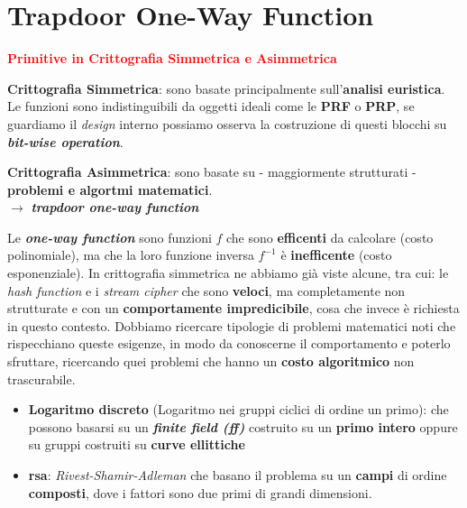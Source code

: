 \newpage

\section{Trapdoor One-Way Function}

\begin{flushleft}
    \textcolor{red}{\textbf{Primitive in Crittografia Simmetrica e Asimmetrica}}
    \begin{center}
        \begin{minipage}[t]{0.45\textwidth}
            \textbf{Crittografia Simmetrica}: sono basate principalmente sull'\textbf{analisi euristica}. Le funzioni sono indistinguibili da oggetti ideali come le \textbf{PRF} o \textbf{PRP}, se guardiamo il \textit{design} interno possiamo osserva la costruzione di questi blocchi su \textbf{\textit{bit-wise operation}}.
        \end{minipage}
        \hfill
        \begin{minipage}[t]{0.45\textwidth}
            \textbf{Crittografia Asimmetrica}: sono basate su - maggiormente strutturati - \textbf{problemi e algortmi matematici}. \\
            $\rightarrow$ \textbf{\textit{trapdoor one-way function}}
        \end{minipage}
    \end{center}

    Le \textbf{\textit{one-way function}} sono funzioni $f$ che sono \textbf{efficenti} da calcolare (costo polinomiale), ma che la loro funzione inversa $f^{-1}$ è \textbf{inefficente} (costo esponenziale). In crittografia simmetrica ne abbiamo già viste alcune, tra cui: le \textit{hash function} e i \textit{stream cipher} che sono \textbf{veloci}, ma completamente non strutturate e con un \textbf{comportamente impredicibile}, cosa che invece è richiesta in questo contesto. Dobbiamo ricercare tipologie di problemi matematici noti che rispecchiano queste esigenze, in modo da conoscerne il comportamento e poterlo sfruttare, ricercando quei problemi che hanno un \textbf{costo algoritmico} non trascurabile.
    \begin{itemize}[nosep]
        \item \textbf{Logaritmo discreto} (Logaritmo nei gruppi ciclici di ordine un primo): che possono basarsi su un \textbf{\textit{finite field (ff)}} costruito su un \textbf{primo intero} oppure su gruppi costruiti su \textbf{curve ellittiche}
        \item \textbf{rsa}: \textit{Rivest-Shamir-Adleman} che basano il problema su un \textbf{campi} di ordine \textbf{composti}, dove i fattori sono due primi di grandi dimensioni.
    \end{itemize}


\end{flushleft}
